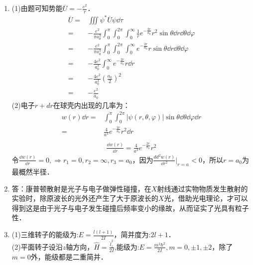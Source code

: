 
\begin{issues}
\issueDraft
\end{issues}


\subsection{ }
\begin{enumerate}
\item 
(1)由题可知势能$\overline{U}=-\frac{e^2}{r}$．
\begin{equation}
\begin{aligned}
\overline{U}=&\iiint \psi^{*} \overline{U} \psi \dd{\tau}\\
=&-\frac{e^2}{\pi a^{3}_{0}}\int^{\pi}_{0}\int^{2\pi}_{0}\int^{\infty}_{0} \frac{1}{r}e^{-\frac{2r}{a_0}}r^{2}\sin{\theta} \dd{r}\dd{\theta}\dd{\varphi}\\
=&-\frac{e^{2}}{\pi a^{3}_{0}}\int^{\pi}_{0}\int^{2\pi}_{0}\int^{\infty}_{0} e^{-\frac{2r}{a_0}}r\sin{\theta} \dd{r}\dd{\theta}\dd{\varphi}\\
=&-\frac{4 e^2}{a^{3}_{0}}\int^{\infty}_{0}e^{-\frac{2r}{a_0}}r\dd{r}\\
=&-\frac{4e^{2}}{a^{3}_{0}}(\frac{a_{0}}{2})^2\\
=&-\frac{e^{2}}{a_{0}}
\end{aligned}
\end{equation}
(2)电子$r+dr$在球壳内出现的几率为：\\
\begin{equation}
\begin{aligned}
w(r)\dd{r}=&\int^{\pi}_{0}\int^{2\pi}_{0} \lvert \psi(r,\theta,\varphi) \rvert \sin{\theta}\dd{\theta}\dd{\varphi}\dd{r}\\
=&\frac{4}{a^{3}}e^{-\frac{2r}{a_0}}r^2 \dd{r}\\
\end{aligned}
\end{equation}
\begin{equation}
\begin{aligned}
\frac{\dd{w(r)}}{\dd{r}}=\frac{4}{a^{3}}e^{-\frac{2r}{a_0}}r^2 
\end{aligned}
\end{equation}
令$\frac{\dd{w(r)}}{\dd{r}}=0,\Longrightarrow r_1 = 0,r_2 = \infty,r_3 = a_0$，因为$\frac{dd^{2}{w(r)}}{\dd{r^{2}}}|_{r = a_{}} < 0$，所以$r = a_0$为最概然半径．

\item
答：康普顿散射是光子与电子做弹性碰撞，在$X$射线通过实物物质发生散射的实验时，除原波长的光外还产生了大于原波长的$X$光，借助光电理论，才可以得到这是由于光子与电子发生碰撞后频率变小的缘故，从而证实了光具有粒子性．

\item 
(1)三维转子的能级为:$E = \frac{l(l+1)}{2I}$，简并度为:$2l+1$．\\
(2)平面转子设沿$z$轴方向，$\hat{H} = \frac{\hat{l}^{2}_{z}}{2I}$,能级为:$E = \frac{m^{2} \hbar^{2}}{2I} ,m = 0 , \pm 1 , \pm 2$，除了$m = 0$外，能级都是二重简并．
\end{enumerate}
